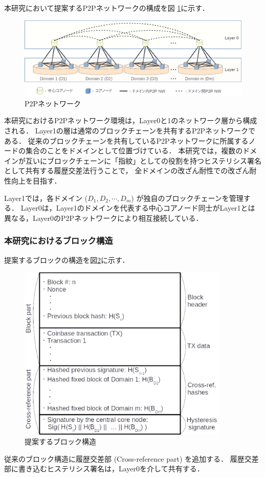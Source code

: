 \documentclass[a4paper,12pt]{jsarticle}
\begin{document}
本研究において提案するP2Pネットワークの構成を図 \ref{fig:p2p}に示す．
%
%
\begin{figure}[H]%
  \begin{center}
    \includegraphics[width=130mm]{pht/p2p_network_image_r1.eps}
  \end{center}
  \caption{P2Pネットワーク}
  \label{fig:p2p}
\end{figure}


本研究におけるP2Pネットワーク環境は，Layer0と1のネットワーク層から構成される．
Layer1の層は通常のブロックチェーンを共有するP2Pネットワークである．
従来のブロックチェーンを共有しているP2Pネットワークに所属するノードの集合のことをドメインとして位置づけている．
本研究では，複数のドメインが互いにブロックチェーンに「指紋」としての役割を持つヒステリシス署名として共有する履歴交差法行うことで，
全ドメインの改ざん耐性での改ざん耐性向上を目指す．

Layer1では，各ドメイン ($D_1, D_2, \cdots, D_m$) が独自のブロックチェーンを管理する．
Layer0は，Layer1のドメインを代表する中心コアノード同士がLayer1とは異なる，Layer0のP2Pネットワークにより相互接続している．

\subsubsection{本研究におけるブロック構造}
提案するブロックの構造を図\ref{fig:block}に示す．
%
\begin{figure}[H]%
  \begin{center}
    \includegraphics[width=100mm]{pht/block_structure.eps}
  \end{center}
  \caption{提案するブロック構造}
  \label{fig:block}
\end{figure}
%
従来のブロック構造に履歴交差部 (Cross-reference part) を追加する．
履歴交差部に書き込むヒステリシス署名は，Layer0を介して共有する．
\end{document}
